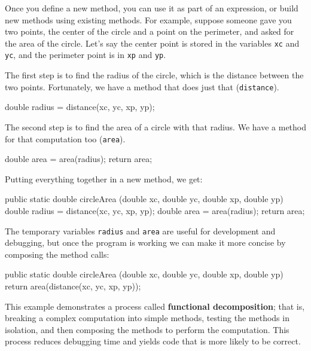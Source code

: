 \documentclass[12pt]{book}
\theoremstyle{exercise}
\newcommand{\java}[1]{\verb"#1"}
\newcommand{\java}[1]{\lstinline{#1}} %
\begin{document}

Once you define a new method, you can use it as part of an expression, or build new methods using existing methods.
For example, suppose someone gave you two points, the center of the circle and a point on the perimeter, and asked for the area of the circle.
Let's say the center point is stored in the variables \java{xc} and \java{yc}, and the perimeter point is in \java{xp} and \java{yp}.

The first step is to find the radius of the circle, which is the distance between the two points.
Fortunately, we have a method that does just that (\java{distance}).


\begin{code}
    double radius = distance(xc, yc, xp, yp);
\end{code}

The second step is to find the area of a circle with that radius.
We have a method for that computation too (\java{area}).

\begin{code}
    double area = area(radius);
    return area;
\end{code}

Putting everything together in a new method, we get:

\begin{code}
    public static double circleArea
            (double xc, double yc, double xp, double yp) {
        double radius = distance(xc, yc, xp, yp);
        double area = area(radius);
        return area;
    }
\end{code}

The temporary variables \java{radius} and \java{area} are useful for development and debugging, but once the program is working we can make it more concise by composing the method calls:

\begin{code}
    public static double circleArea
            (double xc, double yc, double xp, double yp) {
        return area(distance(xc, yc, xp, yp));
    }
\end{code}

This example demonstrates a process called {\bf functional decomposition}; that is, breaking a complex computation into simple methods, testing the methods in isolation, and then composing the methods to perform the computation.
This process reduces debugging time and yields code that is more likely to be correct.
\end{document}
